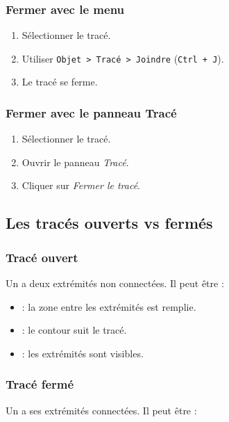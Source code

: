 \subsubsection{Fermer avec le menu}

\begin{enumerate}
    \item Sélectionner le tracé.
    \item Utiliser \texttt{Objet > Tracé > Joindre} (\texttt{Ctrl + J}).
    \item Le tracé se ferme.
\end{enumerate}

\subsubsection{Fermer avec le panneau Tracé}

\begin{enumerate}
    \item Sélectionner le tracé.
    \item Ouvrir le panneau \emph{Tracé}.
    \item Cliquer sur \emph{Fermer le tracé}.
\end{enumerate}

\subsection{Les tracés ouverts vs fermés}

\subsubsection{Tracé ouvert}

Un  a deux extrémités non connectées. Il peut être :

\begin{itemize}
    \item {} : la zone entre les extrémités est remplie.
    \item {} : le contour suit le tracé.
    \item {} : les extrémités sont visibles.
\end{itemize}

\subsubsection{Tracé fermé}

Un  a ses extrémités connectées. Il peut être :

